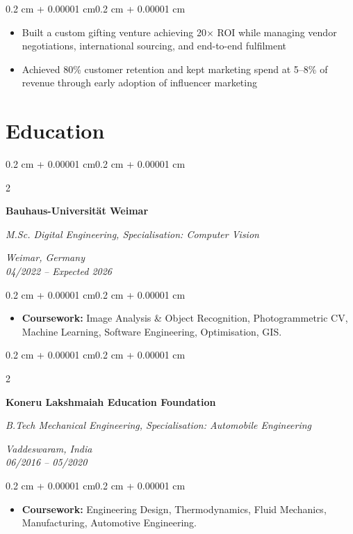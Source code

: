 \documentclass[10pt, a4paper]{article}
\newenvironment{highlights}{
    \begin{itemize}[
        topsep=0.08 cm,
        parsep=0.08 cm,
        partopsep=0pt,
        itemsep=0pt,
        leftmargin=0.4 cm + 10pt
    ]
}{
    \end{itemize}
}
\newenvironment{onecolentry}{
    \begin{adjustwidth}{0.2 cm + 0.00001 cm}{0.2 cm + 0.00001 cm}
}{
    \end{adjustwidth}
}
\newenvironment{twocolentry}[2][]{
    \onecolentry
    \def\secondColumn{#2}
    \setcolumnwidth{\fill, 4.5 cm}
    \begin{paracol}{2}
}{
    \switchcolumn \raggedleft \secondColumn
    \end{paracol}
    \endonecolentry
}
\begin{document}
\vspace{0.10 cm}
\begin{onecolentry}
    \begin{highlights}
        \item Built a custom gifting venture achieving 20× ROI while managing vendor negotiations, international sourcing, and end-to-end fulfilment
        \item Achieved 80\% customer retention and kept marketing spend at 5--8\% of revenue through early adoption of influencer marketing
    \end{highlights}
\end{onecolentry}

\section{Education}

\begin{twocolentry}{\textit{Weimar, Germany}\\\textit{04/2022 -- Expected 2026}}
    \textbf{Bauhaus-Universität Weimar}

    \textit{M.Sc. Digital Engineering, Specialisation: Computer Vision}
\end{twocolentry}

\vspace{0.10 cm}
\begin{onecolentry}
    \begin{highlights}
        \item \textbf{Coursework:} Image Analysis \& Object Recognition, Photogrammetric CV, Machine Learning, Software Engineering, Optimisation, GIS.
    \end{highlights}
\end{onecolentry}

\vspace{0.15cm}

\begin{twocolentry}{\textit{Vaddeswaram, India}\\\textit{06/2016 -- 05/2020}}
    \textbf{Koneru Lakshmaiah Education Foundation}

    \textit{B.Tech Mechanical Engineering, Specialisation: Automobile Engineering}
\end{twocolentry}

\vspace{0.10 cm}
\begin{onecolentry}
    \begin{highlights}
        \item \textbf{Coursework:} Engineering Design, Thermodynamics, Fluid Mechanics, Manufacturing, Automotive Engineering.
    \end{highlights}
\end{onecolentry}
\end{document}
